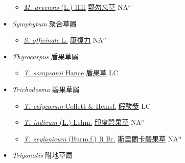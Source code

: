 \begin{itemize}
  \begin{itemize}
        \item[] \href{http://www.theplantlist.org/tpl1.1/search?q=Myosotis+arvensis}{\textit{M. arvensis} (L.) Hill}   \href{\detokenize{http://taibnet.sinica.edu.tw/chi/taibnet_species_list.php?T2=野勿忘草&T2_new_value=true&fr=y}}{野勿忘草} NA$^n$
  \end{itemize}
 \item[] \textit{Symphytum} 聚合草屬
                    
  \begin{itemize}
        \item[] \href{http://www.theplantlist.org/tpl1.1/search?q=Symphytum+officinale}{\textit{S. officinale} L.}   \href{\detokenize{http://taibnet.sinica.edu.tw/chi/taibnet_species_list.php?T2=康復力&T2_new_value=true&fr=y}}{康復力} NA$^n$
  \end{itemize}
 \item[] \textit{Thyrocarpus} 盾果草屬
                    
  \begin{itemize}
        \item[] \href{http://www.theplantlist.org/tpl1.1/search?q=Thyrocarpus+sampsonii}{\textit{T. sampsonii} Hance}   \href{\detokenize{http://taibnet.sinica.edu.tw/chi/taibnet_species_list.php?T2=盾果草&T2_new_value=true&fr=y}}{盾果草} LC
  \end{itemize}
 \item[] \textit{Trichodesma} 碧果草屬
                    
  \begin{itemize}
        \item[] \href{http://www.theplantlist.org/tpl1.1/search?q=Trichodesma+calycosum}{\textit{T. calycosum} Collett \& Hemsl.}   \href{\detokenize{http://taibnet.sinica.edu.tw/chi/taibnet_species_list.php?T2=假酸漿&T2_new_value=true&fr=y}}{假酸漿} LC
        \item[] \href{http://www.theplantlist.org/tpl1.1/search?q=Trichodesma+indicum}{\textit{T. indicum} (L.) Lehm.}   \href{\detokenize{http://taibnet.sinica.edu.tw/chi/taibnet_species_list.php?T2=印度碧果草&T2_new_value=true&fr=y}}{印度碧果草} NA$^n$
        \item[] \href{http://www.theplantlist.org/tpl1.1/search?q=Trichodesma+zeylanicum}{\textit{T. zeylanicum} (Burm.f.) R.Br.}   \href{\detokenize{http://taibnet.sinica.edu.tw/chi/taibnet_species_list.php?T2=斯里蘭卡碧果草&T2_new_value=true&fr=y}}{斯里蘭卡碧果草} NA$^n$
  \end{itemize}
 \item[] \textit{Trigonotis} 附地草屬
                    

\end{itemize}
